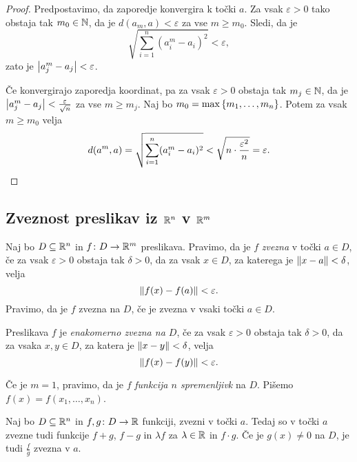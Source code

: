 \begin{proof}
Predpostavimo, da zaporedje konvergira k točki $a$. Za vsak $\varepsilon>0$ tako obstaja tak $m_0\in\mathbb{N}$, da je $d(a_m,a)<\varepsilon$ za vse $m\geq m_0$. Sledi, da je
\[
\sqrt{\sum_{i=1}^n \left(a_i^m-a_i\right)^2}<\varepsilon,
\]
zato je $\left\lvert a_j^m-a_j\right\rvert<\varepsilon$.

Če konvergirajo zaporedja koordinat, pa za vsak $\varepsilon>0$ obstaja tak $m_j\in\mathbb{N}$, da je $\left\lvert a_j^m-a_j\right\rvert<\frac{\varepsilon}{\sqrt{n}}$ za vse $m\geq m_j$. Naj bo $m_0=\max\left\{m_1,\dots,m_n\right\}$. Potem za vsak $m\geq m_0$ velja
\[
d(a^m,a)=\sqrt{\sum_{i=1}^n (a_i^m-a_i)^2}<\sqrt{n\cdot\frac{\varepsilon^2}{n}}=\varepsilon.\qedhere
\]
\end{proof}

\newpage

\subsection{Zveznost preslikav iz $\mathbb{R}^n$ v $\mathbb{R}^m$}

\begin{definicija}
Naj bo $D\subseteq\mathbb{R}^n$ in $f\colon D\to\mathbb{R}^m$ preslikava. Pravimo, da je $f$ \emph{zvezna} v točki $a\in D$, če za vsak $\varepsilon>0$ obstaja tak $\delta>0$, da za vsak $x\in D$, za katerega je $\left\lVert x-a\right\rVert<\delta$, velja
\[
\left\lVert f(x)-f(a)\right\rVert<\varepsilon.
\]
Pravimo, da je $f$ zvezna na $D$, če je zvezna v vsaki točki $a\in D$.
\end{definicija}

\begin{definicija}
Preslikava $f$ je \emph{enakomerno zvezna na $D$}, če za vsak $\varepsilon>0$ obstaja tak $\delta>0$, da za vsaka $x,y\in D$, za katera je $\left\lVert x-y\right\rVert<\delta$, velja
\[
\left\lVert f(x)-f(y)\right\rVert<\varepsilon.
\]
\end{definicija}

\begin{opomba}
Če je $m=1$, pravimo, da je $f$ \emph{funkcija $n$ spremenljivk} na $D$. Pišemo $f(x)=f(x_1,\dots,x_n)$.
\end{opomba}

\begin{izrek}
Naj bo $D\subseteq\mathbb{R}^n$ in $f,g\colon D\to\mathbb{R}$ funkciji, zvezni v točki $a$. Tedaj so v točki $a$ zvezne tudi funkcije $f+g$, $f-g$ in $\lambda f$ za $\lambda\in\mathbb{R}$ in $f\cdot g$. Če je $g(x)\ne 0$ na $D$, je tudi $\frac{f}{g}$ zvezna v $a$.
\end{izrek}

